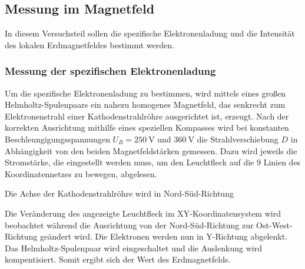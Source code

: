 \subsection{Messung im Magnetfeld}
In diesem Versuchsteil sollen die spezifische Elektronenladung
und die Intensität des lokalen Erdmagnetfeldes bestimmt werden.

\subsubsection{Messung der spezifischen Elektronenladung}
Um die spezifische Elektronenladung zu bestimmen, wird mittels 
eines großen Helmholtz-Spulenpaars ein nahezu homogenes 
Magnetfeld, das senkrecht zum Elektronenstrahl einer 
Kathodenstrahlröhre ausgerichtet ist, erzeugt.
Nach der korrekten Ausrichtung mithilfe eines speziellen
Kompasses wird bei konstanten
Beschleungigungsspannungen $U_B = \SI{250}{\volt}$ und 
$\SI{360}{\volt}$ die Strahlverschiebung $D$ in Abhängigkeit 
von den beiden Magnetfeldstärken gemessen. Dazu wird jeweils die
Stromstärke, die eingestellt werden muss, um den Leuchtfleck
auf die $\num{9}$ Linien des Koordinatennetzes zu bewegen,
abgelesen.

Die Achse der Kathodenstrahlröhre wird in Nord-Süd-Richtung



Die Veränderung des angezeigte Leuchtfleck im 
XY-Koordinatensystem wird beobachtet während die Ausrichtung 
von der Nord-Süd-Richtung zur Ost-West-Richtung geändert wird. 
Die Elektronen werden nun in Y-Richtung abgelenkt. Das 
Helmholtz-Spulenpaar wird eingeschaltet und die Auslenkung 
wird kompentisiert. Somit ergibt sich der Wert des 
Erdmagnetfelds. 
